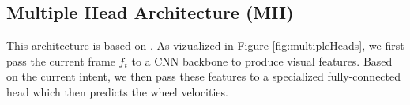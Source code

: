\subsection{Multiple Head Architecture (MH)}
\label{subsec:mh}

This architecture is based on \cite{CodevillaMH}.
As vizualized in Figure \ref{fig:multipleHeads}, we first pass the current frame $f_t$ to a CNN backbone to produce visual features. 
Based on the current intent, we then pass these features to a specialized fully-connected head which then predicts the wheel velocities.
